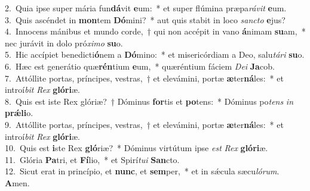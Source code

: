 {2.~}Quia ipse super mária fun\textbf{dá}vit \textbf{e}um:~* et super flúmina præpa\textit{rá}\textit{vit} \textbf{e}um.\\
{3.~}Quis ascéndet in \textbf{mon}tem \textbf{Dó}mini?~* aut quis stabit in loco \textit{san}\textit{cto} \textbf{e}jus?\\
{4.~}Innocens mánibus et mundo corde,~† qui non accépit in vano \textbf{á}nimam \textbf{su}am,~* nec jurávit in dolo pró\textit{xi}\textit{mo} \textbf{su}o.\\
{5.~}Hic accípiet benedicti\textbf{ó}nem a \textbf{Dó}mino:~* et misericórdiam a Deo, salu\textit{tá}\textit{ri} \textbf{su}o.\\
{6.~}Hæc est generátio quæ\textbf{rén}tium \textbf{e}um,~* quæréntium fáciem \textit{De}\textit{i} \textbf{Ja}cob.\\
{7.~}Attóllite portas, príncipes, vestras,~† et elevámini, portæ \textbf{æ}ter\textbf{ná}les:~* et introí\textit{bit} \textit{Rex} \textbf{gló}\textbf{ri}æ.\\
{8.~}Quis est iste Rex glóriæ?~† Dóminus \textbf{for}tis et \textbf{po}tens:~* Dóminus po\textit{tens} \textit{in} \textbf{prǽ}\textbf{li}o.\\
{9.~}Attóllite portas, príncipes, vestras,~† et elevámini, portæ \textbf{æ}ter\textbf{ná}les:~* et introí\textit{bit} \textit{Rex} \textbf{gló}\textbf{ri}æ.\\
{10.~}Quis est \textbf{i}ste Rex \textbf{gló}riæ?~* Dóminus virtútum ipse \textit{est} \textit{Rex} \textbf{gló}\textbf{ri}æ.\\
{11.~}Glória \textbf{Pa}tri, et \textbf{Fí}lio,~* et Spirí\textit{tu}\textit{i} \textbf{San}cto.\\
{12.~}Sicut erat in princípio, et \textbf{nunc}, et \textbf{sem}per,~* et in sǽcula sæcu\textit{ló}\textit{rum}. \textbf{A}men.\\
